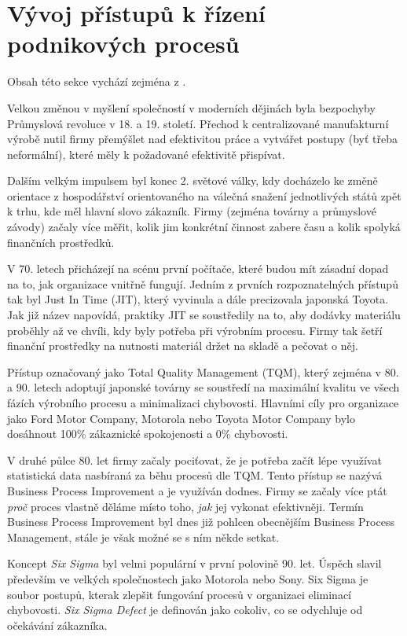\documentclass[]{article}
\begin{document}
\section{Vývoj přístupů k řízení podnikových procesů}
Obsah této sekce vychází zejména z \cite{Panagacos2012}.

Velkou změnou v myšlení společností v moderních dějinách byla bezpochyby Průmyslová revoluce v 18. a 19. století. Přechod k centralizované manufakturní výrobě nutil firmy přemýšlet nad efektivitou práce a vytvářet postupy (byť třeba neformální), které měly k požadované efektivitě přispívat.

Dalším velkým impulsem byl konec 2. světové války, kdy docházelo ke změně orientace z hospodářství orientovaného na válečná snažení jednotlivých států zpět k trhu, kde měl hlavní slovo zákazník. Firmy (zejména továrny a průmyslové závody) začaly více měřit, kolik jim konkrétní činnost zabere času a kolik spolyká finančních prostředků.

V 70. letech přicházejí na scénu první počítače, které budou mít zásadní dopad na to, jak organizace vnitřně fungují. Jedním z prvních rozpoznatelných přístupů tak byl Just In Time (JIT), který vyvinula a dále precizovala japonská Toyota. Jak již název napovídá, praktiky JIT se soustředily na to, aby dodávky materiálu proběhly až ve chvíli, kdy byly potřeba při výrobním procesu. Firmy tak šetří finanční prostředky na nutnosti materiál držet na skladě a pečovat o něj. 

Přístup označovaný jako Total Quality Management (TQM), který zejména v 80. a 90. letech adoptují japonské továrny se soustředí na maximální kvalitu ve všech fázích výrobního procesu a minimalizaci chybovosti. Hlavními cíly pro organizace jako Ford Motor Company, Motorola nebo Toyota Motor Company bylo dosáhnout 100\% zákaznické spokojenosti a 0\% chybovosti.

V druhé půlce 80. let firmy začaly pociťovat, že je potřeba začít lépe využívat statistická data nasbíraná za běhu procesů dle TQM. Tento přístup se nazývá Business Process Improvement a je využíván dodnes. Firmy se začaly více ptát \textit{proč} proces vlastně děláme místo toho, \textit{jak} jej vykonat efektivněji. Termín Business Process Improvement byl dnes již pohlcen obecnějším Business Process Management, stále je však možné se s ním někde setkat.

Koncept \textit{Six Sigma} byl velmi populární v první polovině 90. let. Úspěch slavil především ve velkých společnostech jako Motorola nebo Sony. Six Sigma je soubor postupů, kterak zlepšit fungování procesů v organizaci eliminací chybovosti. \textit{Six Sigma Defect} je definován jako cokoliv, co se odychluje od očekávání zákazníka.
\end{document}
